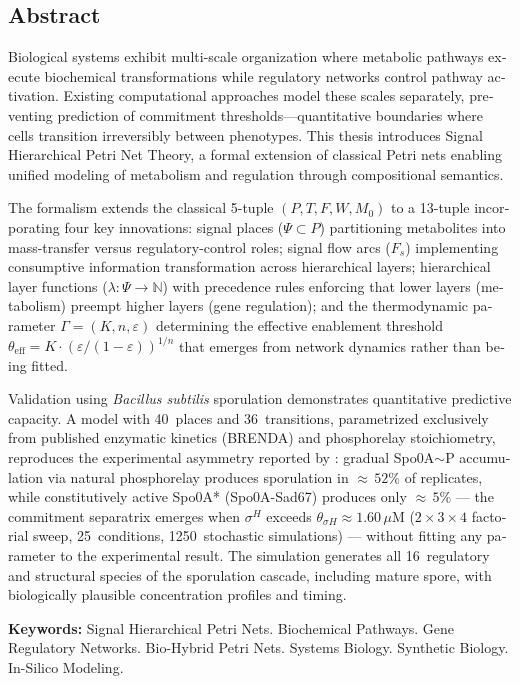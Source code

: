 \begin{otherlanguage}{english}
\chapter*{Abstract}

Biological systems exhibit multi-scale organization where metabolic pathways
execute biochemical transformations while regulatory networks control pathway
activation. Existing computational approaches model these scales separately,
preventing prediction of commitment thresholds---quantitative boundaries where
cells transition irreversibly between phenotypes. This thesis introduces Signal
Hierarchical Petri Net Theory, a formal extension of classical Petri nets
enabling unified modeling of metabolism and regulation through compositional
semantics.

The formalism extends the classical 5-tuple $(P, T, F, W, M_0)$ to a 13-tuple
incorporating four key innovations: signal places ($\Psi \subset P$) partitioning
metabolites into mass-transfer versus regulatory-control roles; signal flow arcs
($F_s$) implementing consumptive information transformation across hierarchical
layers; hierarchical layer functions ($\lambda: \Psi \to \mathbb{N}$) with
precedence rules enforcing that lower layers (metabolism) preempt higher layers
(gene regulation); and the thermodynamic parameter
$\Gamma = (K, n, \varepsilon)$ determining the effective enablement threshold
$\theta_{\text{eff}} = K \cdot (\varepsilon / (1 - \varepsilon))^{1/n}$
that emerges from network dynamics rather than being fitted.

Validation using \emph{Bacillus subtilis} sporulation demonstrates quantitative
predictive capacity. A model with 40~places and 36~transitions, parametrized
exclusively from published enzymatic kinetics (BRENDA) and phosphorelay
stoichiometry, reproduces the experimental asymmetry reported by
\textcite{Fujita2005}: gradual Spo0A${\sim}$P accumulation via natural
phosphorelay produces sporulation in ${\approx}\,52\%$ of replicates, while
constitutively active Spo0A* (Spo0A-Sad67) produces only ${\approx}\,5\%$ ---
the commitment separatrix emerges when $\sigma^H$ exceeds
$\theta_{\sigma H} \approx 1.60\,\mu$M ($2 \times 3 \times 4$ factorial sweep,
25~conditions, 1250~stochastic simulations) --- without fitting any parameter
to the experimental result. The simulation generates all 16~regulatory and
structural species of the sporulation cascade, including mature spore, with
biologically plausible concentration profiles and timing.

\vspace{1cm}
\noindent\textbf{Keywords:} Signal Hierarchical Petri Nets. Biochemical Pathways.
Gene Regulatory Networks. Bio-Hybrid Petri Nets. Systems Biology. Synthetic
Biology. In-Silico Modeling.
\end{otherlanguage}
